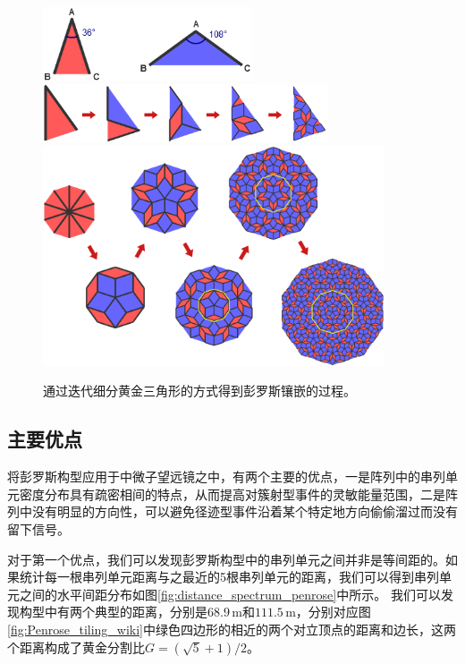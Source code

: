 \begin{figure}[!htb]%
    \centering
    \includegraphics[width=0.55\textwidth]{img/penrose_triangles.png}
    \vskip 1cm
    \includegraphics[width=0.75\textwidth]{img/penrose_splite.png}
    \vskip 1cm
    \includegraphics[width=0.90\textwidth]{img/penrose_iteration.png}
    \caption{通过迭代细分黄金三角形的方式得到彭罗斯镶嵌的过程。}
    \label{fig:penrose_iteration}
\end{figure}


\subsection{主要优点}

将彭罗斯构型应用于中微子望远镜之中，有两个主要的优点，一是阵列中的串列单元密度分布具有疏密相间的特点，从而提高对簇射型事件的灵敏能量范围，二是阵列中没有明显的方向性，可以避免径迹型事件沿着某个特定地方向偷偷溜过而没有留下信号。

对于第一个优点，我们可以发现彭罗斯构型中的串列单元之间并非是等间距的。如果统计每一根串列单元距离与之最近的5根串列单元的距离，我们可以得到串列单元之间的水平间距分布如图\ref{fig:distance_spectrum_penrose}中所示。
我们可以发现构型中有两个典型的距离，分别是$68.9\,\mathrm{m}$和$111.5\,\mathrm{m}$，分别对应图\ref{fig:Penrose_tiling_wiki}中绿色四边形的相近的两个对立顶点的距离和边长，这两个距离构成了黄金分割比$G = (\sqrt{5}+1)/2$。

